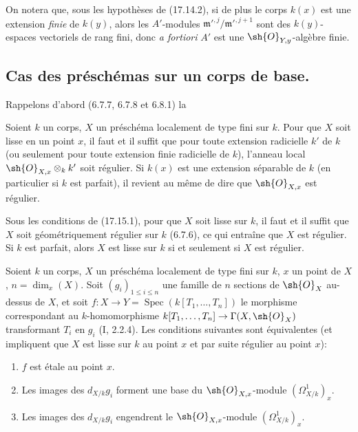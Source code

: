 \begin{remark}[17.14.3]
\label{IV.17.14.3}
On notera que, sous les hypothèses de (17.14.2), si de plus le corps $k(x)$ est une extension \emph{finie} de $k(y)$, alors les $A'$-modules $\mathfrak m'^{,j}/\mathfrak m'^{,j+1}$ sont des $k(y)$-espaces vectoriels de rang fini, donc \emph{a fortiori} $A'$ est une $\sh{O}_{Y,y}$-algèbre finie.
\end{remark}

\subsection{Cas des préschémas sur un corps de base.}
\label{subsection:IV.17.15}

Rappelons d'abord (6.7.7, 6.7.8 et 6.8.1) la

\begin{proposition}[17.15.1]
\label{IV.17.15.1}
Soient $k$ un corps, $X$ un préschéma localement de type fini sur $k$. Pour que $X$ soit lisse en un point $x$, il faut et il suffit que pour toute extension radicielle $k'$ de $k$ (ou seulement pour toute extension finie radicielle de $k$), l'anneau local $\sh{O}_{X,x}\otimes_k k'$ soit régulier. Si $k(x)$ est une extension séparable de $k$ (en particulier si $k$ est parfait), il revient au même de dire que $\sh{O}_{X,x}$ est régulier.
\end{proposition}

\begin{corollary}[17.15.2]
\label{IV.17.15.2}
Sous les conditions de (17.15.1), pour que $X$ soit lisse sur $k$, il faut et il suffit que $X$ soit géométriquement régulier sur $k$ (6.7.6), ce qui entraîne que $X$ est régulier. Si $k$ est parfait, alors $X$ est lisse sur $k$ si et seulement si $X$ est régulier.
\end{corollary}

\begin{proposition}[17.15.3]
\label{IV.17.15.3}
Soient $k$ un corps, $X$ un préschéma localement de type fini sur $k$, $x$ un point de $X$, $n=\dim_x(X)$. Soit $(g_i)_{1\leq i\leq n}$ une famille de $n$ sections de $\sh{O}_X$ au-dessus de $X$, et soit $f:X\to Y=\operatorname{Spec}(k[T_1,\ldots,T_n])$ le morphisme correspondant au $k$-homomorphisme $k[T_1,\ldots,T_n]\to\Gamma(X,\sh{O}_X)$ transformant $T_i$ en $g_i$ (I, 2.2.4). Les conditions suivantes sont équivalentes (et impliquent que $X$ est lisse sur $k$ au point $x$ et par suite régulier au point $x$):
\begin{enumerate}
  \item[a)] $f$ est étale au point $x$.
  \item[b)] Les images des $d_{X/k}g_i$ forment une base du $\sh{O}_{X,x}$-module $(\Omega^1_{X/k})_x$.
  \item[c)] Les images des $d_{X/k}g_i$ engendrent le $\sh{O}_{X,x}$-module $(\Omega^1_{X/k})_x$.
\end{enumerate}
\end{proposition}

